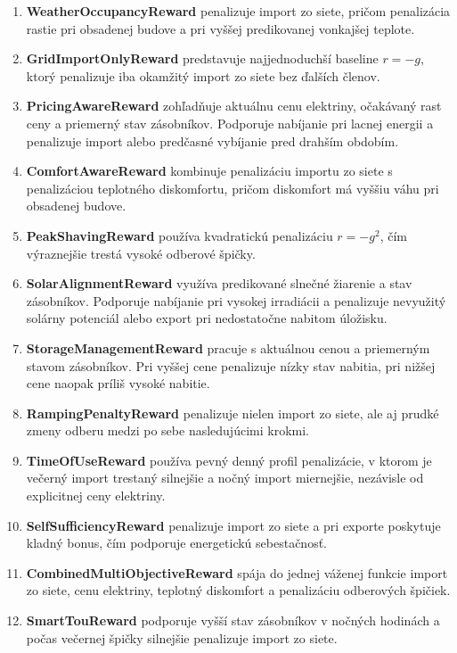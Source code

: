 \documentclass[conference]{IEEEtran}
\begin{document}
\begin{enumerate}
\item \textbf{WeatherOccupancyReward} penalizuje import zo siete, pričom penalizácia rastie pri obsadenej budove a pri vyššej predikovanej vonkajšej teplote.

\item \textbf{GridImportOnlyReward} predstavuje najjednoduchší baseline $r=-g$, ktorý penalizuje iba okamžitý import zo siete bez ďalších členov.

\item \textbf{PricingAwareReward} zohľadňuje aktuálnu cenu elektriny, očakávaný rast ceny a priemerný stav zásobníkov. Podporuje nabíjanie pri lacnej energii a penalizuje import alebo predčasné vybíjanie pred drahším obdobím.

\item \textbf{ComfortAwareReward} kombinuje penalizáciu importu zo siete s penalizáciou teplotného diskomfortu, pričom diskomfort má vyššiu váhu pri obsadenej budove.

\item \textbf{PeakShavingReward} používa kvadratickú penalizáciu $r=-g^2$, čím výraznejšie trestá vysoké odberové špičky.

\item \textbf{SolarAlignmentReward} využíva predikované slnečné žiarenie a stav zásobníkov. Podporuje nabíjanie pri vysokej irradiácii a penalizuje nevyužitý solárny potenciál alebo export pri nedostatočne nabitom úložisku.

\item \textbf{StorageManagementReward} pracuje s aktuálnou cenou a priemerným stavom zásobníkov. Pri vyššej cene penalizuje nízky stav nabitia, pri nižšej cene naopak príliš vysoké nabitie.

\item \textbf{RampingPenaltyReward} penalizuje nielen import zo siete, ale aj prudké zmeny odberu medzi po sebe nasledujúcimi krokmi.

\item \textbf{TimeOfUseReward} používa pevný denný profil penalizácie, v ktorom je večerný import trestaný silnejšie a nočný import miernejšie, nezávisle od explicitnej ceny elektriny.

\item \textbf{SelfSufficiencyReward} penalizuje import zo siete a pri exporte poskytuje kladný bonus, čím podporuje energetickú sebestačnosť.

\item \textbf{CombinedMultiObjectiveReward} spája do jednej váženej funkcie import zo siete, cenu elektriny, teplotný diskomfort a penalizáciu odberových špičiek.

\item \textbf{SmartTouReward} podporuje vyšší stav zásobníkov v nočných hodinách a počas večernej špičky silnejšie penalizuje import zo siete.
\end{enumerate}
\end{document}
